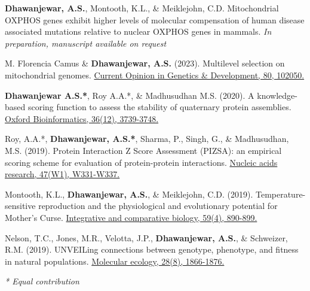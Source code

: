 


\begin{cvpubs}

\vspace{-1mm}


  \pubentry
    {\textbf{Dhawanjewar, A.S.}, Montooth, K.L., \& Meiklejohn, C.D.}
  {Mitochondrial OXPHOS genes exhibit higher levels of molecular compensation of human disease associated mutations relative to nuclear OXPHOS genes in mammals.}
  {\textit{In preparation, manuscript available on request}}

  \pubentry
    {M. Florencia Camus \& \textbf{Dhawanjewar, A.S.} (2023).}
  {Multilevel selection on mitochondrial genomes.}
  {\href{https://doi.org/10.1016/j.gde.2023.102050}{Current Opinion in Genetics \& Development, 80, 102050.}}

  \pubentry
    {\textbf{Dhawanjewar A.S.*}, Roy A.A.*, \& Madhusudhan M.S. (2020).}
	{A knowledge-based scoring function to assess the stability of quaternary protein assemblies.}
	{\href{https://doi.org/10.1101/562520}{Oxford Bioinformatics, 36(12), 3739-3748.}} 
	
  \pubentry
     {Roy, A.A.*, \textbf{Dhawanjewar, A.S.*}, Sharma, P., Singh, G., \& Madhusudhan, M.S. (2019).}
  	{Protein Interaction Z Score Assessment (PIZSA): an empirical scoring scheme for evaluation of protein-protein interactions.} 
	{\href{https://doi.org/10.1093/nar/gkz368}{Nucleic acids research, 47(W1), W331-W337.}}

  \pubentry
    {Montooth, K.L., \textbf{Dhawanjewar, A.S.}, \& Meiklejohn, C.D. (2019).}
	{Temperature-sensitive reproduction and the physiological and evolutionary potential for Mother's Curse.}	{\href{https://doi.org/10.1093/icb/icz091}{Integrative and comparative biology, 59(4), 890-899.}}

  \pubentry
    {Nelson, T.C., Jones, M.R., Velotta, J.P., \textbf{Dhawanjewar, A.S.}, \& Schweizer, R.M. (2019).}
	{UNVEILing connections between genotype, phenotype, and fitness in natural populations.}
	{\href{https://doi.org/10.1111/mec.15067}{Molecular ecology, 28(8), 1866-1876.}}
		
	\fontsize{10pt}{1em}\bodyfontlight\itshape\color{graytext} * Equal contribution

\end{cvpubs}

\vspace{2mm}


 \\


